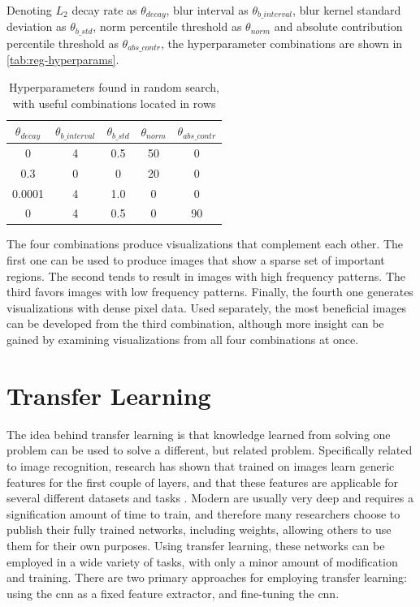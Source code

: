 \noindent Denoting $L_2$ decay rate as $\theta_{decay}$, blur interval as $\theta_{b\_interval}$, blur kernel standard deviation as $\theta_{b\_std}$, norm percentile threshold as $\theta_{norm}$ and absolute contribution percentile threshold as $\theta_{abs\_contr}$, the hyperparameter combinations are shown in \autoref{tab:reg-hyperparams}.

\begin{table}[!h]
\begin{center}
\begin{tabular}{|c|c|c|c|c|}
\hline
\textbf{$\theta_{decay}$} & \textbf{$\theta_{b\_interval}$} & \textbf{$\theta_{b\_std}$} & \textbf{$\theta_{norm}$} & \textbf{$\theta_{abs\_contr}$} \\ \hline
0 & 4 & 0.5 & 50 & 0 \\ \hline
0.3 & 0 & 0 & 20 & 0 \\ \hline
0.0001 & 4 & 1.0 & 0 & 0 \\ \hline
0 & 4 & 0.5 & 0 & 90 \\ \hline
\end{tabular}
\end{center}
\caption[Hyperparameters found in random search.]{Hyperparameters found in random search, with useful combinations located in rows}
\label{tab:reg-hyperparams}
\end{table}

\noindent The four combinations produce visualizations that complement each other. The first one can be used to produce images that show a sparse set of important regions. The second tends to result in images with high frequency patterns. The third favors images with low frequency patterns. Finally, the fourth one generates visualizations with dense pixel data. Used separately, the most beneficial images can be developed from the third combination, although more insight can be gained by examining visualizations from all four combinations at once.

\section{Transfer Learning} \label{sec:transfer-learning}

The idea behind transfer learning is that knowledge learned from solving one problem can be used to solve a different, but related problem. Specifically related to image recognition, research has shown that  trained on images learn generic features for the first couple of layers, and that these features are applicable for several different datasets and tasks \cite{transfer-learning-yosinski}. Modern  are usually very deep and requires a signification amount of time to train, and therefore many researchers choose to publish their fully trained networks, including weights, allowing others to use them for their own purposes. Using transfer learning, these networks can be employed in a wide variety of tasks, with only a minor amount of modification and training. There are two primary approaches for employing transfer learning: using the \acrshort{cnn} as a fixed feature extractor, and fine-tuning the \acrshort{cnn}. \\ 

